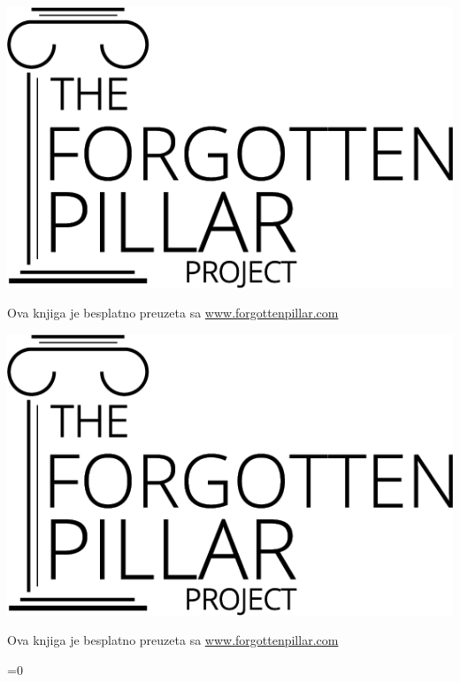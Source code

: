 {\ifepub
    \includegraphics[width=\linewidth]{images/logo-black.png}

    Ova knjiga je besplatno preuzeta sa \href{https://forgottenpillar.com/book/the-forgotten-pillar}{www.forgottenpillar.com}
\else
     \noindent
     \begin{minipage}{0.3\textwidth}
         \includegraphics[width=\linewidth]{images/logo-black.png}
     \end{minipage}%
     \hfill
     \begin{minipage}{\dimexpr\linewidth-0.3\textwidth-0.125\textwidth-1em\relax}
         \raggedleft\footnotesize
         Ova knjiga je besplatno preuzeta sa \href{https://forgottenpillar.com/book/the-forgotten-pillar?lang=\currentlang&type=\currentlayout}{www.forgottenpillar.com}
     \end{minipage}%
     \ifnum{}=0
     \else
         \hfill
         \begin{minipage}{0.125\textwidth}
             \centering
         \end{minipage}
     \fi%
\fi
}

\pagebreak